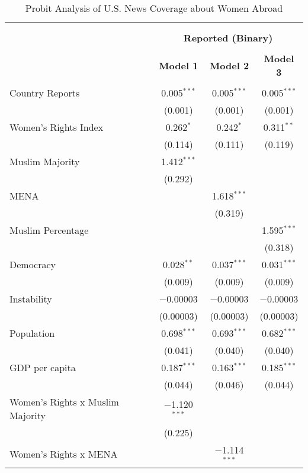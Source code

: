 
\begin{table}[!htbp] \centering 
  \caption{Probit Analysis of U.S. News Coverage about Women Abroad} 
  \label{table:probit} 
\begin{tabular}{@{\extracolsep{5pt}}lccc} 
\\[-1.8ex]\hline \\[-1.8ex] 
\\[-1.8ex] & \multicolumn{3}{c}{\textbf{Reported (Binary)}} \\ 
\\[-1.8ex] & \textbf{Model 1} & \textbf{Model 2} & \textbf{Model 3}\\ 
\hline \\[-1.8ex] 
 Country Reports & 0.005$^{***}$ & 0.005$^{***}$ & 0.005$^{***}$ \\ 
  & (0.001) & (0.001) & (0.001) \\ 
  Women's Rights Index & 0.262$^{*}$ & 0.242$^{*}$ & 0.311$^{**}$ \\ 
  & (0.114) & (0.111) & (0.119) \\ 
  Muslim Majority & 1.412$^{***}$ &  &  \\ 
  & (0.292) &  &  \\ 
  MENA &  & 1.618$^{***}$ &  \\ 
  &  & (0.319) &  \\ 
  Muslim Percentage &  &  & 1.595$^{***}$ \\ 
  &  &  & (0.318) \\ 
  Democracy & 0.028$^{**}$ & 0.037$^{***}$ & 0.031$^{***}$ \\ 
  & (0.009) & (0.009) & (0.009) \\ 
  Instability & $-$0.00003 & $-$0.00003 & $-$0.00003 \\ 
  & (0.00003) & (0.00003) & (0.00003) \\ 
  Population & 0.698$^{***}$ & 0.693$^{***}$ & 0.682$^{***}$ \\ 
  & (0.041) & (0.040) & (0.040) \\ 
  GDP per capita & 0.187$^{***}$ & 0.163$^{***}$ & 0.185$^{***}$ \\ 
  & (0.044) & (0.046) & (0.044) \\ 
  Women's Rights x Muslim Majority & $-$1.120$^{***}$ &  &  \\ 
  & (0.225) &  &  \\ 
  Women's Rights x MENA &  & $-$1.114$^{***}$ &  \\ 

\end{tabular}
\end{table}
